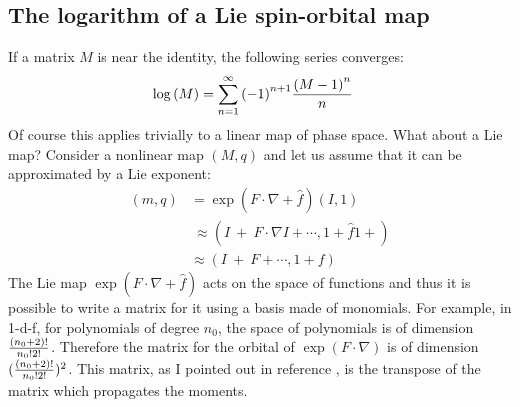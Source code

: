 \documentclass[english,12pt,article]{article} %
\begin{document}
{{{ \subsection{ The logarithm of a Lie spin-orbital map}\label{sec:log}  
If a matrix $M$ is near the identity, the following series converges:
%
\begin{align} \log\left({M}\right)&=\sum\limits_{n=
1}^{\infty } {\left({-1}\right)}^{n+1}{{\left({M-1}\right)}^{n} \over n}\label{logm}\end{align}
%
Of course this applies trivially to a linear map of phase space. What about a Lie map? Consider a nonlinear map $(M,q)$ and let us assume that it can be approximated by a Lie exponent:
%
\begin{align}\left({m,q}\right)&=\exp\left({F\cdot \nabla +\hat{f}}\right)\left({I,1}\right)\nonumber \\
 &\ \approx \left({I\ +\ F\cdot \nabla I+\cdots,1+\hat{f}1+}\right)\nonumber \\
 &\approx \left({I\ +\ F+\cdots,1+f}\right)\label{expIa}\end{align}
%
The Lie map $\exp\left({F\cdot \nabla + \hat{f}}\right)$ acts on the space of functions and thus it is possible to write a matrix for it using a basis made of monomials. For example, in 1-d-f, for polynomials of degree $n_0$, the space of  polynomials is of dimension $(n_0+2)!\over {n_0!2!}$. Therefore the matrix for the orbital of  $\exp\left({F\cdot \nabla }\right)$ is of dimension $({(n_0+2)!\over {n_0!2!}})^2$. This matrix, as I pointed out in reference \cite{thebook}, is the transpose of the matrix which propagates the moments.  

}}}
\end{document}
